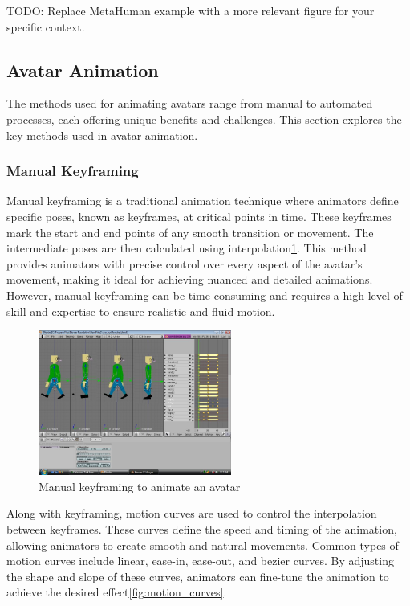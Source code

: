 \documentclass[../../main.tex]{subfiles}
\begin{document}
TODO: Replace MetaHuman example with a more relevant figure for your specific context.

\subsection{Avatar Animation}

The methods used for animating avatars range from manual to automated processes, each offering unique benefits and challenges. This section explores the key methods used in avatar animation.

\subsubsection{Manual Keyframing}

Manual keyframing is a traditional animation technique where animators define specific poses, known as keyframes, at critical points in time. These keyframes mark the start and end points of any smooth transition or movement. The intermediate poses are then calculated using interpolation\ref{fig:keyframing}. This method provides animators with precise control over every aspect of the avatar’s movement, making it ideal for achieving nuanced and detailed animations. However, manual keyframing can be time-consuming and requires a high level of skill and expertise to ensure realistic and fluid motion.

\begin{figure}
  \centering \includegraphics[width = 2.5in]{chapters/background_work/images/keyframing.png}
  \caption{Manual keyframing to animate an avatar}
  \label{fig:keyframing}
\end{figure}

Along with keyframing, motion curves\cite{0.1145/218380.218422} are used to control the interpolation between keyframes. These curves define the speed and timing of the animation, allowing animators to create smooth and natural movements. Common types of motion curves include linear, ease-in, ease-out, and bezier curves. By adjusting the shape and slope of these curves, animators can fine-tune the animation to achieve the desired effect\ref{fig:motion_curves}.
\end{document}
